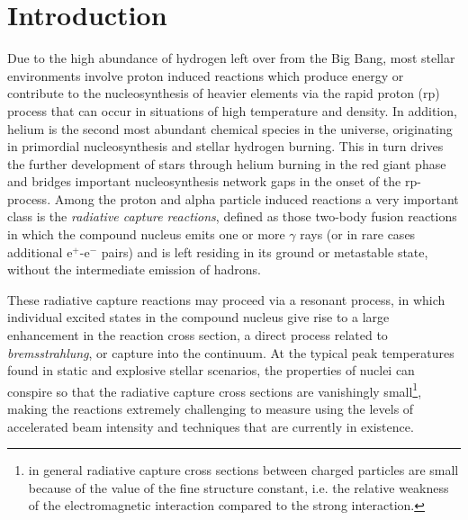 \section{Introduction}
\label{intro}

Due to the high abundance of hydrogen left over from the Big Bang, most stellar environments involve proton induced reactions which produce energy or contribute to the nucleosynthesis of heavier elements via the rapid proton (rp) process that can occur in situations of high temperature and density. In addition, helium is the second most abundant chemical species in the universe, originating in primordial nucleosynthesis and stellar hydrogen burning. This in turn drives the further development of stars through helium burning in the red giant phase and bridges important nucleosynthesis network gaps in the onset of the rp-process. Among the proton and alpha particle induced reactions a very important class is the {\em radiative capture reactions}, defined as those two-body fusion reactions in which the compound nucleus emits one or more $\gamma$ rays (or in rare cases additional e$^{+}$-e$^{-}$ pairs) and is left residing in its ground or metastable state, without the intermediate emission of hadrons. 

These radiative capture reactions may proceed via a resonant process, in which individual excited states in the compound nucleus give rise to a large enhancement in the reaction cross section, a direct process related to {\em bremsstrahlung}, or capture into the continuum. At the typical peak temperatures found in static and explosive stellar scenarios, the properties of nuclei can conspire so that the radiative capture cross sections are vanishingly small\footnote{in general radiative capture cross sections between charged particles are small because of the value of the fine structure constant, i.e. the relative weakness of the electromagnetic interaction compared to the strong interaction.}, making the reactions extremely challenging to measure using the levels of accelerated beam intensity and techniques that are currently in existence. 

